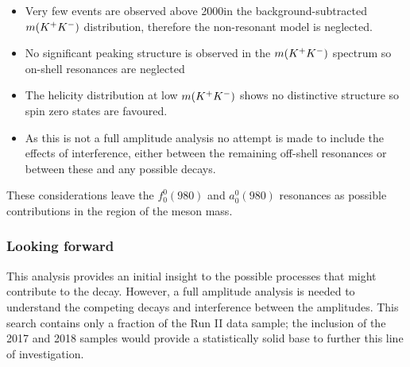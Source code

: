 \begin{itemize}
\item Very few events are observed above 2000\mevcc in the background-subtracted $m({{K}^+}{{K}^-})$ distribution, therefore the non-resonant model is neglected.
\item No significant peaking structure is observed in the $m({{K}^+}{{K}^-})$ spectrum so on-shell resonances are neglected
\item The helicity distribution at low $m({{K}^+}{{K}^-})$ shows no distinctive structure so spin zero states are favoured.  
\item As this is not a full amplitude analysis no attempt is made to include the effects of interference, either between the remaining off-shell resonances or between these and any possible \decay{\Bp}{\Dsp\phiz} decays.
\end{itemize}

These considerations leave the $f_{0}^{0}(980)$ and $a_{0}^{0}(980)$ resonances as possible contributions in the region of the \phiz meson mass. 



\subsubsection{Looking forward}

This analysis provides an initial insight to the possible processes that might contribute to the \decay{\Bp}{\Dsp\Kp\Km} decay. However, a full amplitude analysis is needed to understand the competing decays and interference between the amplitudes. This search contains only a fraction of the Run II data sample; the inclusion of the 2017 and 2018 samples would provide a statistically solid base to further this line of investigation. 

